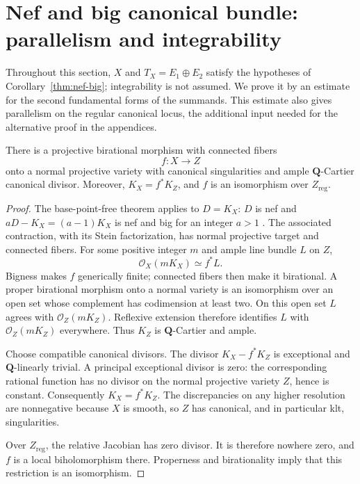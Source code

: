 \section{Nef and big canonical bundle: parallelism and integrability}
\label{sec:canonical}

Throughout this section, \(X\) and \(T_X=E_1\oplus E_2\) satisfy the
hypotheses of Corollary~\ref{thm:nef-big}; integrability is not assumed.
We prove it by an estimate for the second fundamental forms of the
summands. This estimate also gives parallelism on the regular canonical
locus, the additional input needed for the alternative proof in the
appendices.

\begin{proposition}\label{canon:contraction}
There is a projective birational morphism with connected fibers
\[
 f:X\longrightarrow Z
\]
onto a normal projective variety with canonical singularities and ample
\(\mathbf Q\)-Cartier canonical divisor.  Moreover,
\(K_X=f^*K_Z\), and \(f\) is an isomorphism over \(Z_{\mathrm{reg}}\).
\end{proposition}

\begin{proof}
The base-point-free theorem applies to \(D=K_X\): \(D\) is nef and
\(aD-K_X=(a-1)K_X\) is nef and big for an integer \(a>1\)
\cite[Theorem~3.3]{KM98}.  The associated contraction, with its Stein
factorization, has normal projective target and connected fibers.
For some positive integer \(m\) and ample line bundle \(L\) on \(Z\),
\[
 \mathcal O_X(mK_X)\simeq f^*L.
\]
Bigness makes \(f\) generically finite; connected fibers then make it
birational.  A proper birational morphism onto a normal variety is an
isomorphism over an open set whose complement has codimension at least
two.  On this open set \(L\) agrees with
\(\mathcal O_Z(mK_Z)\).  Reflexive extension therefore identifies
\(L\) with \(\mathcal O_Z(mK_Z)\) everywhere.  Thus \(K_Z\) is
\(\mathbf Q\)-Cartier and ample.

Choose compatible canonical divisors.  The divisor
\(K_X-f^*K_Z\) is exceptional and \(\mathbf Q\)-linearly trivial.
A principal exceptional divisor is zero: the corresponding rational
function has no divisor on the normal projective variety \(Z\), hence
is constant.  Consequently \(K_X=f^*K_Z\).  The discrepancies on any
higher resolution are nonnegative because \(X\) is smooth, so \(Z\)
has canonical, and in particular klt, singularities.

Over \(Z_{\mathrm{reg}}\), the relative Jacobian has zero divisor.
It is therefore nowhere zero, and \(f\) is a local biholomorphism
there.  Properness and birationality imply that this restriction is an
isomorphism.
\end{proof}

